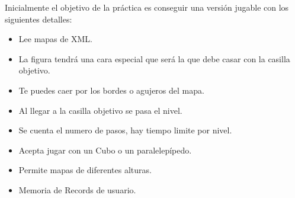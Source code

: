 \documentclass[11pt]{article}
\begin{document}
  Inicialmente el objetivo de la práctica es conseguir una versión
  jugable con los siguientes detalles:
\begin{itemize}
\item Lee mapas de XML.
\item La figura tendrá una cara especial que será la que debe casar con
    la casilla objetivo.
\item Te puedes caer por los bordes o agujeros del mapa.
\item Al llegar a la casilla objetivo se pasa el nivel.
\item Se cuenta el numero de pasos, hay tiempo limite por nivel.
\item Acepta jugar con un Cubo o un paralelepípedo.
\item Permite mapas de diferentes alturas.
\item Memoria de Records de usuario.
\end{itemize}
\end{document}
